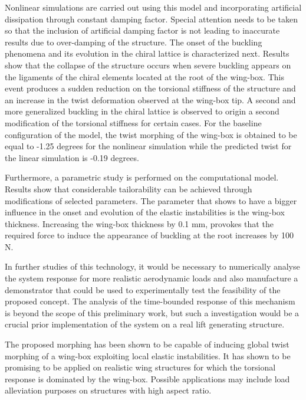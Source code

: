 Nonlinear simulations are carried out using this model and incorporating artificial dissipation through constant damping factor. Special attention needs to be taken so that the inclusion of artificial damping factor is not leading to inaccurate results due to over-damping of the structure. The onset of the buckling phenomena and its evolution in the chiral lattice is characterized next. Results show that the collapse of the structure occurs when severe buckling appears on the ligaments of the chiral elements located at the root of the wing-box. This event produces a sudden reduction on the torsional stiffness of the structure and an increase in the twist deformation observed at the wing-box tip. A second and more generalized buckling in the chiral lattice is observed to origin a second modification of the torsional stiffness for certain cases. For the baseline configuration of the model, the twist morphing of the wing-box is obtained to be equal to -1.25 degrees for the nonlinear simulation while the predicted twist for the linear simulation is -0.19 degrees.

Furthermore, a parametric study is performed on the computational model. Results show that considerable tailorability can be achieved through modifications of selected parameters. The parameter that shows to have a bigger influence in the onset and evolution of the elastic instabilities is the wing-box thickness. Increasing the wing-box thickness by 0.1 mm, provokes that the required force to induce the appearance of buckling at the root increases by 100 N. 

In further studies of this technology, it would be necessary to numerically analyse the system response for more realistic aerodynamic loads and also manufacture a demonstrator that could be used to experimentally test the feasibility of the proposed concept. The analysis of the time-bounded response of this mechanism is beyond the scope of this preliminary work, but such a investigation would be a crucial prior implementation of the system on a real lift generating structure.

The proposed morphing has been shown to be capable of inducing global twist morphing of a wing-box exploiting local elastic instabilities. It has shown to be promising to be applied on realistic wing structures for which the torsional response is dominated by the wing-box. Possible applications may include load alleviation purposes on structures with high aspect ratio. 